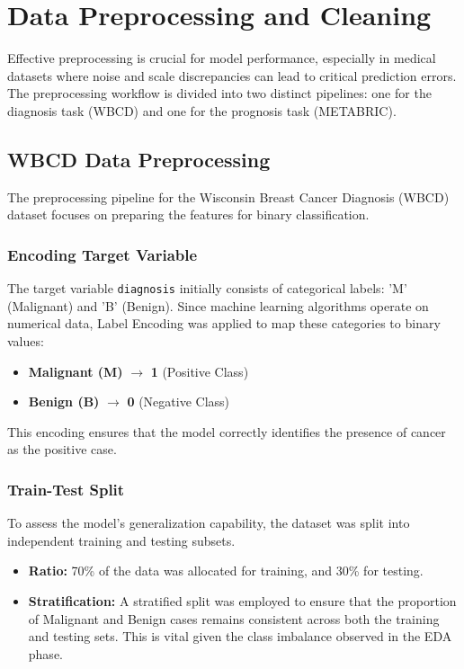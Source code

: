 \chapter{Data Preprocessing and Cleaning}

Effective preprocessing is crucial for model performance, especially in medical datasets where noise and scale discrepancies can lead to critical prediction errors. The preprocessing workflow is divided into two distinct pipelines: one for the diagnosis task (WBCD) and one for the prognosis task (METABRIC).

\section{WBCD Data Preprocessing}
The preprocessing pipeline for the Wisconsin Breast Cancer Diagnosis (WBCD) dataset focuses on preparing the features for binary classification.

\subsection{Encoding Target Variable}
The target variable \texttt{diagnosis} initially consists of categorical labels: 'M' (Malignant) and 'B' (Benign). Since machine learning algorithms operate on numerical data, Label Encoding was applied to map these categories to binary values:
\begin{itemize}
    \item \textbf{Malignant (M)} $\rightarrow$ \textbf{1} (Positive Class)
    \item \textbf{Benign (B)} $\rightarrow$ \textbf{0} (Negative Class)
\end{itemize}
This encoding ensures that the model correctly identifies the presence of cancer as the positive case.

\subsection{Train-Test Split}
To assess the model's generalization capability, the dataset was split into independent training and testing subsets.
\begin{itemize}
    \item \textbf{Ratio:} 70\% of the data was allocated for training, and 30\% for testing.
    \item \textbf{Stratification:} A stratified split was employed to ensure that the proportion of Malignant and Benign cases remains consistent across both the training and testing sets. This is vital given the class imbalance observed in the EDA phase.
\end{itemize}

